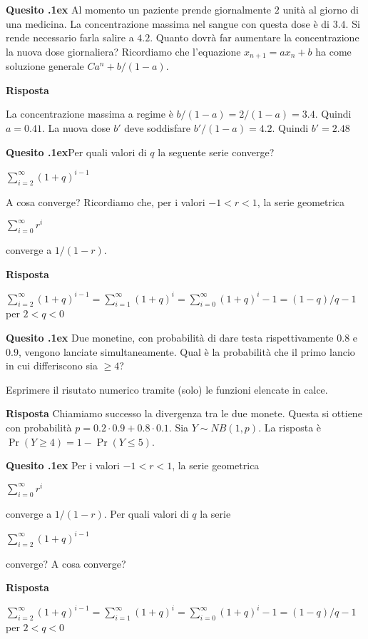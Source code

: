 \documentclass[11pt,twoside,a4paper]{article}
\newcounter{quesito}
\newenvironment{question}{\addtocounter{quesito}{1}\par\textbf{Quesito \thequesito.\kern1ex}}{\vspace{0.5\parskip}}
\newenvironment{answer}{\par\textbf{Risposta\quad}}{\vspace{\parskip}}
\begin{document}
\begin{question}
Al momento un paziente prende giornalmente $2$ unità al giorno di una medicina. La concentrazione massima nel sangue con questa dose è di $3.4$. Si rende necessario farla salire a $4.2$. Quanto dovrà far aumentare la concentrazione la nuova dose giornaliera? Ricordiamo che l'equazione $x_{n+1}=ax_n +b$ ha come soluzione generale $Ca^n+b/(1-a)$.
\begin{answer}

La concentrazione massima a regime è $b/(1-a)=2/(1-a)=3.4$. Quindi $a=0.41$. La nuova dose $b'$ deve soddisfare $b'/(1-a)=4.2$. Quindi $b'=2.48$
\end{answer}
\end{question}

\begin{question}Per quali valori di $q$ la seguente serie converge?

\hfil$\displaystyle \sum^\infty_{i=2}(1+q)^{i-1}$

A cosa converge? Ricordiamo che, per i valori $-1<r<1$, la serie geometrica 

\hfil$\displaystyle \sum^\infty_{i=0}r^i$ 

converge a $1/(1-r)$. 
\begin{answer}

$\displaystyle \sum^\infty_{i=2}(1+q)^{i-1}=\sum^\infty_{i=1}(1+q)^{i}=\sum^\infty_{i=0}(1+q)^{i}-1=(1-q)/q -1$ per $2<q<0$

\end{answer}
\end{question}



\begin{question}
Due monetine, con probabilità di dare testa rispettivamente $0.8$ e $0.9$, vengono lanciate simultaneamente. Qual è la probabilità che il primo lancio in cui differiscono sia $\ge 4$? 

Esprimere il risutato numerico tramite (solo) le funzioni elencate in calce.
\begin{answer}
Chiamiamo successo la divergenza tra le due monete. Questa si ottiene con probabilità $p=0.2\cdot0.9+0.8\cdot0.1$. Sia $Y\sim NB(1,p)$. La risposta è $\Pr(Y\ge 4)=1-\Pr(Y\le 5)$.
\end{answer}
\end{question}

\begin{question} Per i valori $-1<r<1$, la serie geometrica 

\hfil$\displaystyle \sum^\infty_{i=0}r^i$ 

converge a $1/(1-r)$. Per quali valori di $q$ la serie 

\hfil$\displaystyle \sum^\infty_{i=2}(1+q)^{i-1}$

converge? A cosa converge?
\begin{answer}

$\displaystyle \sum^\infty_{i=2}(1+q)^{i-1}=\sum^\infty_{i=1}(1+q)^{i}=\sum^\infty_{i=0}(1+q)^{i}-1=(1-q)/q -1$ per $2<q<0$

\end{answer}
\end{question}
\end{document}

